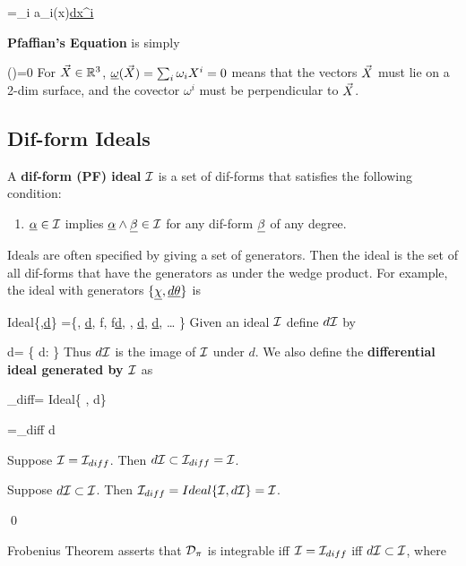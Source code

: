 \beq
\ul{\omega}=\sum_i a_i(x)\ul{dx^i}
\eeq

{\bf Pfaffian's Equation}
is simply

\beq
\ul{\omega}(\vecX)=0
\eeq
For ${\vec{X}}\in { \mathbb{R}}^3$,
$\ul{\omega}(\vecX)=\sum_i\omega_iX^i=0$ means that the vectors ${\vec{X}}$ must 
lie on a 2-dim surface,
and the covector $\omega^i$ 
must be perpendicular to  ${\vec{X}}$.

\subsection{Dif-form Ideals}
\label{sec-dif-form-ideal}

A {\bf dif-form (PF) ideal} ${\cal I}$ is a set
of dif-forms that satisfies the following condition:

\begin{enumerate}
\item $\ul{\alp}\in \cali$ implies 
$\ul{\alp}\wedge \ul{\beta}\in \cali$ for any dif-form $
\ul{\beta}$ of any degree.
\end{enumerate}

Ideals are often specified by giving
a set of generators. 
Then the ideal is the set
of all dif-forms that have the generators as
 under the wedge product.
For example, 
the ideal with
generators $\{\ul{\chi},\ul{d\theta}\}$ is

\beq
Ideal\{\ul{\chi},\ul{d\theta}\}
=\{\ul{\chi},\quad
 \ul{d\theta}, \quad
f\ul{\chi},\quad
f\ul{d\theta},\quad
\alp\wedge \ul{\chi},\quad
 \ul{\alp}\wedge \ul{d\theta},\quad
\beta\wedge \ul{\chi}\wedge\ul{d\theta},\quad 
\ldots
\}
\eeq
Given an ideal ${\cal I}$ define $d{\cal I}$ by

\beq
d\cali = \{ d\ul{\omega}: \omega\in \cali\}
\eeq
Thus $d{\cal I}$ is the image of ${\cal I}$ under $d$.
We also define the {\bf differential ideal generated by ${\cal I}$} as

\beq
\cali_{diff}= Ideal\{ \cali, d\cali\}
\eeq
\begin{claim}

\beq
\cali =\cali_{diff}\quad
{} \quad d\cali \subset \cali
\eeq

\end{claim}
\proof

Suppose ${\cal I} ={\cal I}_{diff}$. Then $d{\cal I} \subset 
{\cal I}_{diff}={\cal I}$.

Suppose $d{\cal I}\subset {\cal I}$. Then ${\cal I}_{diff}=Ideal\{{\cal I}, d{\cal I}\}={\cal I}$.

\qed

Frobenius Theorem 
asserts that ${\cal D}_\pi$ is integrable
iff ${\cal I}={\cal I}_{diff}$ iff $d{\cal I}\subset {\cal I}$,
where

